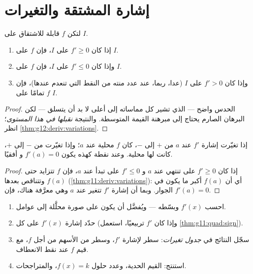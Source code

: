 \section{إشارة المشتقة والتغيرات}

\begin{theorem}\label{thm:g11:deriv:variations}
لتكن $f$ قابلة للاشتقاق على  $I$.
\begin{enumerate}
  \item إذا كان $f' \geq 0$ على $I$، فإن $f$  على $I$.
  \item وإذا كان $f' \leq 0$ على $I$، فإن $f$  على $I$.
  \item وإذا كان $f' > 0$ على $I$ (عدا، ربما، عند عدد منته من النقط التي
        تنعدم عندها)، فإن $f$  تمامًا على $I$.
\end{enumerate}
\end{theorem}

\begin{proof}
الحدس واضح ---  الذي تشير كل مماساته إلى أعلى لا بد أن
يتسلق --- لكن البرهان الصارم يحتاج إلى مبرهنة القيمة المتوسطة. والنتيجة
\emph{نقبلها في هذا المستوى}؛ انظر \cref{thm:g12:deriv:variations}.
\end{proof}

\begin{proposition}\label{prop:g11:deriv:extrema}
إذا تغيّرت إشارة $f'$ عند $a$ من $+$ إلى $-$، كان  $f$  محلية
عند $a$؛ وإذا تغيّرت من $-$ إلى $+$، كانت لها  محلية. وعند نقطة كهذه يكون $f'(a) = 0$ و
 أفقيًا.
\end{proposition}

\begin{proof}
إذا كان $f' \geq 0$ على  تنتهي عند $a$ و $f' \leq 0$ على 
تبدأ عند $a$، فإن $f$ تتزايد حتى $f(a)$ وتتناقص بعدها
(\cref{thm:g11:deriv:variations}): أي أن $f(a)$ أكبر ما يكون في الجوار. وبما أن إشارة $f'$
تتغير عند $a$ وهي معرَّفة هناك، فإن $f'(a) = 0$.
\end{proof}

\begin{method}\label{met:g11:deriv:study}
\begin{enumerate}
  \item احسب $f'(x)$ وبسّطه --- ويُفضَّل أن يكون على صورة محلَّلة إلى عوامل.
  \item حدّد إشارة $f'(x)$ على كل  (وإذا كان $f'$
        تربيعيًا، استعمل \cref{thm:g11:quad:sign}).
  \item سجّل النتائج في \emph{جدول تغيرات}: سطر
        لإشارة $f'$، وسطر من الأسهم من أجل $f$، مع قيم $f$ عند
        نقط الانعطاف.
  \item استنتج: القيم الحدية، وعدد حلول $f(x) = k$، والمتراجحات.
\end{enumerate}
\end{method}

